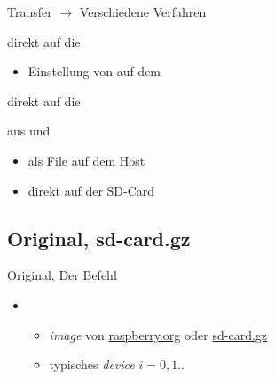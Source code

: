\begin{frame}{Transfer $\to$ \target}{Verschiedene Verfahren}
 \begin{description}[Zusammenbau]
  \item[Original] direkt auf die 
  \begin{itemize}
   \item Einstellung von  auf dem \target 
  \end{itemize}
  \item[sd-card.gz] direkt auf die 
  \item[Zusammenbau] aus  und 
 \begin{itemize}
  \item als File auf dem Host
  \item direkt auf der SD-Card
 \end{itemize}
 \end{description}
\end{frame}

\subsection{Original, sd-card.gz}
\begin{frame}{Original, }{Der Befehl }
 \begin{itemize}
  \item {}
  \begin{itemize}
   \item {\em image} von \url{raspberry.org} oder \url{sd-card.gz}
   \item typisches {\em device}  $i=0,1 ..$
  \end{itemize}
 \end{itemize}
\end{frame}

